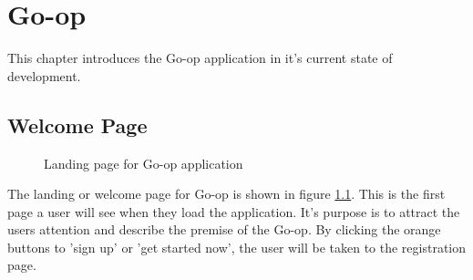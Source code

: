 
\chapter{Go-op} %
\label{Goop} %

This chapter introduces the Go-op application in it's current state of development.

\section{Welcome Page}
\begin{figure}
\centering
{}
\decoRule
\caption[Go-op Welcome Page]{Landing page for Go-op application}
\label{fig:welpage}
\end{figure}

The landing or welcome page for Go-op is shown in figure \ref{fig:welpage}. This is the first page a user will see when they load the application. It's purpose is to attract the users attention and describe the premise of the Go-op. By clicking the orange buttons to 'sign up' or 'get started now', the user will be taken to the registration page.\\

